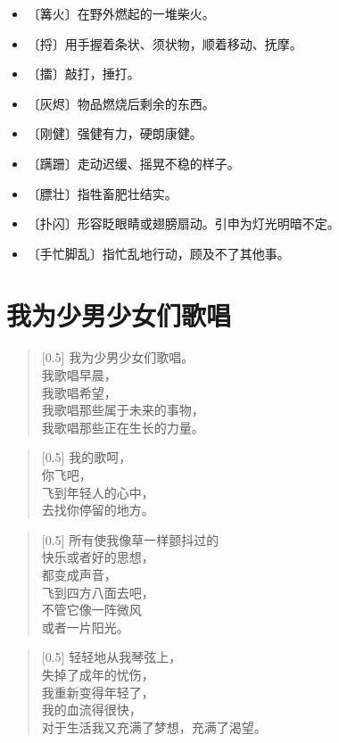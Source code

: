 \documentclass[12pt,UTF-8,openany]{ctexbook}
\begin{document}
\begin{itemize}
    \setlength\itemsep{-0.2em}
    \item 〔篝火〕在野外燃起的一堆柴火。
    \item 〔捋〕用手握着条状、须状物，顺着移动、抚摩。
    \item 〔擂〕敲打，捶打。
    \item 〔灰烬〕物品燃烧后剩余的东西。
    \item 〔刚健〕强健有力，硬朗康健。
    \item 〔蹒跚〕走动迟缓、摇晃不稳的样子。
    \item 〔膘壮〕指牲畜肥壮结实。
    \item 〔扑闪〕形容眨眼睛或翅膀扇动。引申为灯光明暗不定。
    \item 〔手忙脚乱〕指忙乱地行动，顾及不了其他事。
\end{itemize}

\chapter{我为少男少女们歌唱}

\begin{large}
    
    \begin{verse}[0.5\linewidth]
        我为少男少女们歌唱。 \\
        我歌唱早晨， \\
        我歌唱希望， \\
        我歌唱那些属于未来的事物， \\
        我歌唱那些正在生长的力量。
    \end{verse}
    
    
    \begin{verse}[0.5\linewidth]
        我的歌呵， \\
        你飞吧， \\
        飞到年轻人的心中， \\
        去找你停留的地方。
    \end{verse}
    
    
    \begin{verse}[0.5\linewidth]
        所有使我像草一样颤抖过的 \\
        快乐或者好的思想， \\
        都变成声音， \\
        飞到四方八面去吧， \\
        不管它像一阵微风 \\
        或者一片阳光。
    \end{verse}
    
    
    \begin{verse}[0.5\linewidth]
        轻轻地从我琴弦上， \\
        失掉了成年的忧伤， \\
        我重新变得年轻了， \\
        我的血流得很快， \\
        对于生活我又充满了梦想，充满了渴望。
    \end{verse}
    
\end{large}
\end{document}
